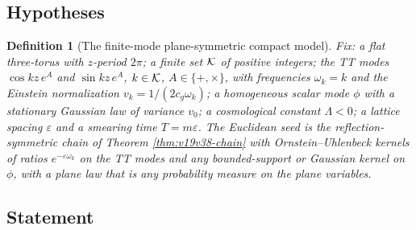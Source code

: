 \documentclass[11pt]{article}
\newtheorem{definition}[theorem]{Definition}
\theoremstyle{remark}
\begin{document}
\subsection{Hypotheses}

\begin{definition}[The finite-mode plane-symmetric compact model]
\label{def:v19v64-model}
Fix: a flat three-torus with \(z\)-period \(2\pi\); a finite set
\({\cal K}\) of positive integers; the TT modes
\(\cos kz\,e^A\) and \(\sin kz\,e^A\), \(k\in{\cal K}\),
\(A\in\{+,\times\}\), with frequencies \(\omega_k=k\) and the Einstein
normalization \(v_k=1/(2c_g\omega_k)\); a homogeneous scalar mode
\(\phi\) with a stationary Gaussian law of variance \(v_0\); a
cosmological constant \(\Lambda<0\); a lattice spacing \(\varepsilon\)
and a smearing time \(T=m\varepsilon\).  The Euclidean seed is the
reflection-symmetric chain of Theorem \ref{thm:v19v38-chain} with
Ornstein--Uhlenbeck kernels of ratios \(e^{-\varepsilon\omega_k}\) on
the TT modes and any bounded-support or Gaussian kernel on \(\phi\),
with a plane law that is any probability measure on the plane
variables.
\end{definition}

\subsection{Statement}
\end{document}
